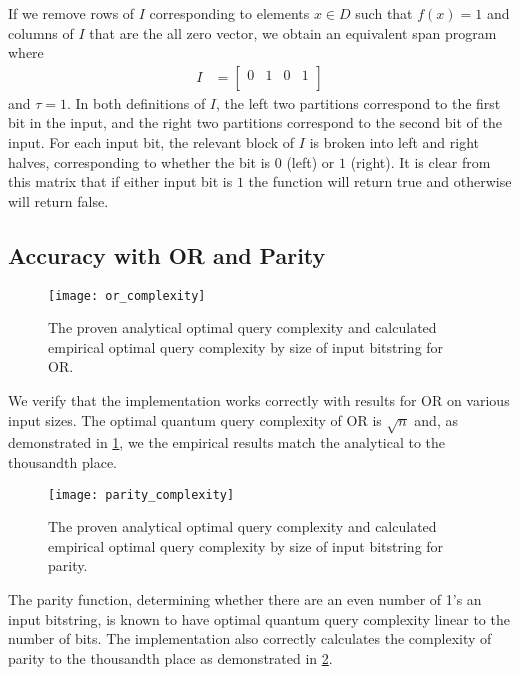 If we remove rows of $I$ corresponding to elements 
$ x \in D$ such that $f(x) = 1$
and columns of $I$ that are the 
all zero vector, we obtain an equivalent span program where
\begin{align}
I &= \left[\begin{array}{cccc}
   0 & 1 & 0 & 1 \\
\end{array} \right] \nonumber
\end{align}
and $\tau = 1$.
In both definitions of $I$, the left two partitions
correspond to the first bit in the
input, and the right two partitions correspond 
to the second bit of the input. For each
input bit, the relevant block of $I$ 
is broken into left and right halves, corresponding
to whether the bit is $0$ (left) or $1$ (right). 
It is clear from this matrix that if either input bit is
$1$ the function will return true and otherwise
will return false.

\subsection{Accuracy with OR and Parity}

\begin{figure}[H]
\centering
\texttt{[image: or\_complexity]}
\caption{The proven analytical optimal query complexity
and calculated empirical optimal query complexity by 
size of input bitstring for OR.}
\label{fig:or_complexity}
\end{figure}

We verify that the implementation works correctly
with results for OR on various input sizes.
The optimal quantum query complexity of OR
is $\sqrt{n}$ and, as demonstrated in
\cref{fig:or_complexity},
we the empirical results match the analytical
to the thousandth place.

\begin{figure}[H]
\centering
\texttt{[image: parity\_complexity]}
\caption{The proven analytical optimal query complexity
and calculated empirical optimal query complexity by 
size of input bitstring for parity.}
\label{fig:parity_complexity}
\end{figure}

The parity function, determining whether
there are an even number of 1's an input
bitstring, is known to have optimal
quantum query complexity linear to the number of bits.
The implementation also correctly
calculates the complexity of parity to the thousandth
place as demonstrated in \cref{fig:parity_complexity}.

